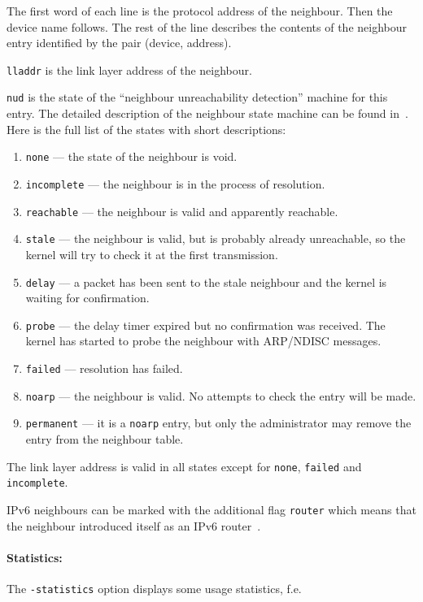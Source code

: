 The first word of each line is the protocol address of the neighbour.
Then the device name follows. The rest of the line describes the contents of
the neighbour entry identified by the pair (device, address).

\verb|lladdr| is the link layer address of the neighbour.

\verb|nud| is the state of the ``neighbour unreachability detection'' machine
for this entry. The detailed description of the neighbour
state machine can be found in~\cite{RFC-NDISC}. Here is the full list
of the states with short descriptions:

\begin{enumerate}
\item\verb|none| --- the state of the neighbour is void.
\item\verb|incomplete| --- the neighbour is in the process of resolution.
\item\verb|reachable| --- the neighbour is valid and apparently reachable.
\item\verb|stale| --- the neighbour is valid, but is probably already
unreachable, so the kernel will try to check it at the first transmission.
\item\verb|delay| --- a packet has been sent to the stale neighbour and the kernel is waiting
for confirmation.
\item\verb|probe| --- the delay timer expired but no confirmation was received.
The kernel has started to probe the neighbour with ARP/NDISC messages.
\item\verb|failed| --- resolution has failed.
\item\verb|noarp| --- the neighbour is valid. No attempts to check the entry
will be made.
\item\verb|permanent| --- it is a \verb|noarp| entry, but only the administrator
may remove the entry from the neighbour table.
\end{enumerate}

The link layer address is valid in all states except for \verb|none|,
\verb|failed| and \verb|incomplete|.

IPv6 neighbours can be marked with the additional flag \verb|router|
which means that the neighbour introduced itself as an IPv6 router~\cite{RFC-NDISC}.

\paragraph{Statistics:} The \verb|-statistics| option displays some usage
statistics, f.e.\

